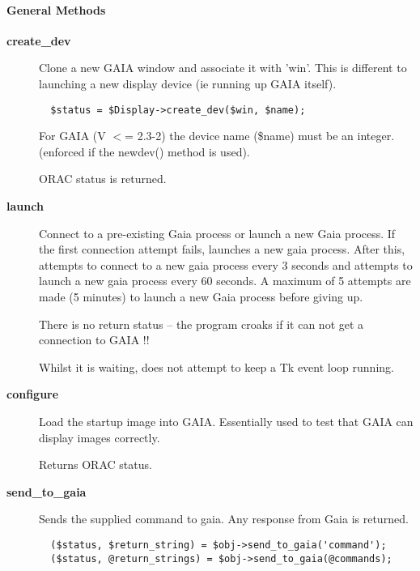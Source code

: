 \paragraph*{General Methods\label{ORAC::Display::GAIA_General_Methods}}
\begin{description}

\item[\textbf{create\_dev}] \mbox{}

Clone a new GAIA window and associate it with 'win'. This is different
to launching a new display device (ie running up GAIA itself).

\begin{verbatim}
  $status = $Display->create_dev($win, $name);
\end{verbatim}


For GAIA (V $<$= 2.3-2) the device name (\$name) must be an integer.
(enforced if the newdev() method is used).



ORAC status is returned.


\item[\textbf{launch}] \mbox{}

Connect to a pre-existing Gaia process or launch a new Gaia process.
If the first connection attempt fails, launches a new gaia process.
After this, attempts to connect to a new gaia process every 3 seconds
and attempts to launch a new gaia process every 60 seconds.
A maximum of 5 attempts are made (5 minutes) to launch a new Gaia
process before giving up.



There is no return status -- the program croaks if it can not
get a connection to GAIA !!



Whilst it is waiting, does not attempt to keep a \textsf{Tk} event loop
running.


\item[\textbf{configure}] \mbox{}

Load the startup image into GAIA. Essentially used to test that
GAIA can display images correctly.



Returns ORAC status.


\item[\textbf{send\_to\_gaia}] \mbox{}

Sends the supplied command to gaia. Any response from Gaia is returned.

\begin{verbatim}
  ($status, $return_string) = $obj->send_to_gaia('command');
  ($status, @return_strings) = $obj->send_to_gaia(@commands);
\end{verbatim}



\end{description}
